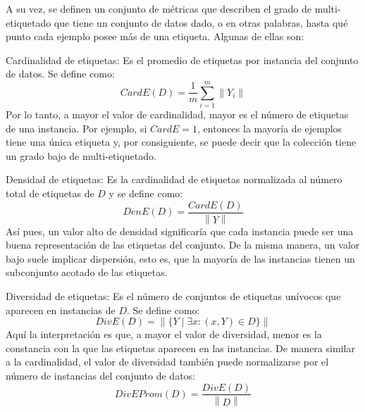A su vez, se definen un conjunto de métricas que describen el grado de
multi-etiquetado que tiene un conjunto de datos dado, o en otras palabras, hasta
qué punto cada ejemplo posee más de una etiqueta. Algunas de ellas son: 

\begin{description}
   \item{Cardinalidad de etiquetas}: Es el promedio de etiquetas por instancia
      del conjunto de datos. Se define como: 
      \begin{equation}
      \label{eq:mll_card}
         CardE(D) = \frac{1}{m} \sum_{i=1}^{m} \left\|Y_{i}\right\|
      \end{equation}
      Por lo tanto, a mayor el valor de cardinalidad, mayor es el número de
      etiquetas de una instancia. Por ejemplo, si $CardE = 1$, entonces la
      mayoría de ejemplos tiene una única etiqueta y, por consiguiente, se puede
      decir que la colección tiene un grado bajo de multi-etiquetado.  
   \item{Densidad de etiquetas}: Es la cardinalidad de etiquetas normalizada al
      número total de etiquetas de $D$ y se define como:
      \begin{equation}
         DenE(D) = \frac{CardE(D)}{\left\|Y\right\|}
      \end{equation}
      Así pues, un valor alto de densidad significaría que cada instancia puede
      ser una buena representación de las etiquetas del conjunto. De la misma
      manera, un valor bajo suele implicar dispersión, esto es, que la mayoría
      de las instancias tienen un subconjunto acotado de las etiquetas. 
   \item{Diversidad de etiquetas}: Es el número de conjuntos de etiquetas
      unívocos que aparecen en instancias de $D$. Se define como:
      \begin{equation}
         DivE(D) = \left\|\{Y \mid \exists x: (x, Y) \in D\}\right\|
      \end{equation}
      Aquí la interpretación es que, a mayor el valor de diversidad, menor es la
      constancia con la que las etiquetas aparecen en las instancias. De manera
      similar a la cardinalidad, el valor de diversidad también puede
      normalizarse por el número de instancias del conjunto de datos: 
      \begin{equation}
         DivEProm(D) = \frac{DivE(D)}{\left\|D\right\|}
      \end{equation}
\end{description}

